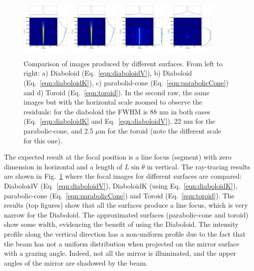 \documentclass[a4paper, 11pt]{article}
\begin{document}
\begin{figure}
\includegraphics[width=0.22\textwidth]{figures/p2s_V_z.png}
\includegraphics[width=0.22\textwidth]{figures/p2s_K_z.png}
\includegraphics[width=0.22\textwidth]{figures/p2s_parabolic-cone_z.png}
\includegraphics[width=0.22\textwidth]{figures/p2s_toroid_z.png}
\caption{\label{fig:pointToSegment}Comparison of images produced by different surfaces. From left to right: a) Diaboloid (Eq.~\ref{eqn:diaboloidV}), b) Diaboloid (Eq.~\ref{eqn:diaboloidK}), c) parabolid-cone (Eq.~\ref{eqn:parabolicCone}) and d) Toroid (Eq.~\ref{eqn:toroid}). In the second raw, the same images but with the horizontal scale zoomed to observe the residuals: for the diaboloid the FWHM is 88 nm in both cases (Eq.~\ref{eqn:diaboloidK} and Eq.~\ref{eqn:diaboloidV}), 22 nm for the parabolic-cone, and 2.5 $\mu$m for the toroid (note the different scale for this one).
}
\end{figure}

The expected result at the focal position is a line focus (segment) with zero dimension in horizontal and a length of $L\sin\theta$ in vertical. The ray-tracing results are shown in Fig.~\ref{fig:pointToSegment} where the focal images for different surfaces are compared: DiaboloidV (Eq.~\ref{eqn:diaboloidV}), DiaboloidK (using Eq.~\ref{eqn:diaboloidK}), parabolic-cone (Eq.~\ref{eqn:parabolicCone}) and Toroid (Eq.~\ref{eqn:toroid}). The results (top figures) show that all the surfaces produce a line focus, which is very narrow for the Diaboloid. The approximated surfaces (parabolic-cone and toroid) show some width, evidencing the benefit of using the Diaboloid. The intensity profile along the vertical direction has a non-uniform profile due to the fact that the beam has not a uniform distribution when projected on the mirror surface with a grazing angle. Indeed, not all the mirror is illuminated, and the upper angles of the mirror are shadowed by the beam. 
\end{document}
